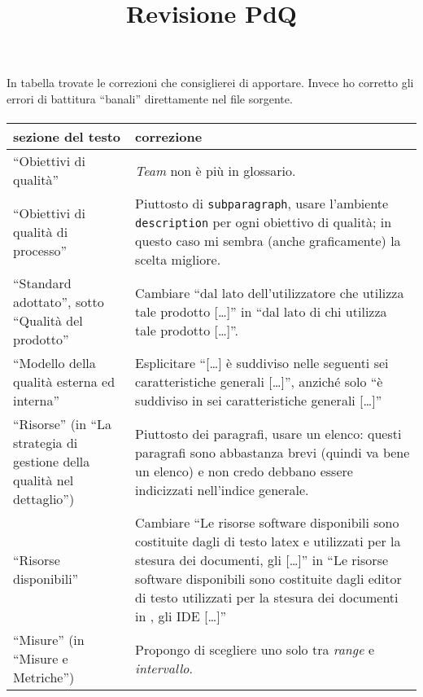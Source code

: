 \documentclass[a4paper]{article}
\title{Revisione PdQ}
\author{\GG}
\begin{document}
\maketitle

\paragraph{}
In tabella trovate le correzioni che consiglierei di apportare. Invece ho corretto gli errori di battitura “banali” direttamente nel file sorgente.

\paragraph{}
\begin{longtable}{| p{3cm} | p{10cm} |}
	\hline
	\textbf{sezione del testo} & \textbf{correzione} \\ \hline
	\hline
	“Obiettivi di qualità” & \emph{Team} non è più in glossario. \\ \hline
	“Obiettivi di qualità di processo” & Piuttosto di \texttt{subparagraph}, usare l'ambiente \texttt{description} per ogni obiettivo di qualità; in questo caso mi sembra (anche graficamente) la scelta migliore. \\ \hline
	“Standard adottato”, sotto “Qualità del prodotto” & Cambiare “dal lato dell’utilizzatore che utilizza tale prodotto [\dots]” in “dal lato di chi utilizza tale prodotto [\dots]”. \\ \hline
	“Modello della qualità esterna ed interna” & Esplicitare “[\dots] è suddiviso nelle seguenti sei caratteristiche generali [\dots]”, anziché solo “è suddiviso in sei caratteristiche generali [\dots]” \\ \hline
	“Risorse” (in “La strategia di gestione della qualità nel dettaglio”) & Piuttosto dei paragrafi, usare un elenco: questi paragrafi sono abbastanza brevi (quindi va bene un elenco) e non credo debbano essere indicizzati nell'indice generale. \\ \hline
	“Risorse disponibili” & Cambiare “Le risorse software disponibili sono costituite dagli \gloss{editor} di testo latex e utilizzati per la stesura dei documenti, gli \gloss{IDE} [\dots]” in “Le risorse software disponibili sono costituite dagli editor di testo utilizzati per la stesura dei documenti in \gloss{Latex}, gli IDE [\dots]” \\ \hline
	“Misure” (in “Misure e Metriche”) & Propongo di scegliere uno solo tra \emph{range} e \emph{intervallo}. \\ \hline

\end{longtable}
\end{document}
